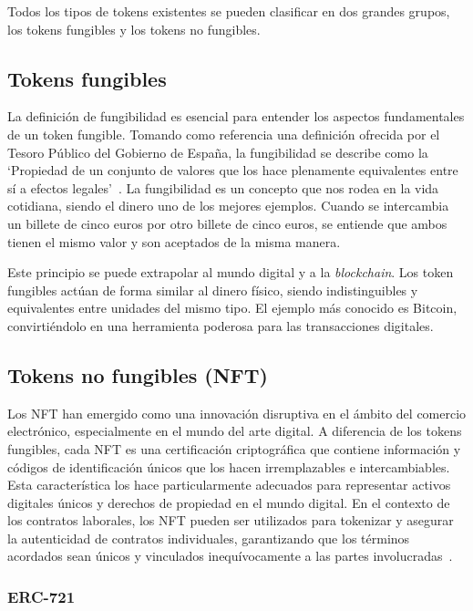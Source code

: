 Todos los tipos de tokens existentes se pueden clasificar en dos grandes grupos, los tokens fungibles y los tokens no fungibles.


\subsection{Tokens fungibles}

La definición de fungibilidad es esencial para entender los aspectos fundamentales de un token fungible. Tomando como referencia una definición ofrecida por el Tesoro Público del Gobierno de España, la fungibilidad se describe como la `Propiedad de un conjunto de valores que los hace plenamente equivalentes entre sí a efectos legales'~\cite{fungibilidadGob}.
La fungibilidad es un concepto que nos rodea en la vida cotidiana, siendo el dinero uno de los mejores ejemplos. Cuando se intercambia un billete de cinco euros por otro billete de cinco euros, se entiende que ambos tienen el mismo valor y son aceptados de la misma manera.

Este principio se puede extrapolar al mundo digital y a la \textit{blockchain}. Los token fungibles actúan de forma similar al dinero físico, siendo indistinguibles y equivalentes entre unidades del mismo tipo.
El ejemplo más conocido es Bitcoin, convirtiéndolo en una herramienta poderosa para las transacciones digitales.


\subsection{Tokens no fungibles (NFT)}

Los NFT han emergido como una innovación disruptiva en el ámbito del comercio electrónico, especialmente en el mundo del arte digital.
A diferencia de los tokens fungibles, cada NFT es una certificación criptográfica que contiene información y códigos de identificación únicos que los hacen irremplazables e intercambiables.
Esta característica los hace particularmente adecuados para representar activos digitales únicos y derechos de propiedad en el mundo digital.
En el contexto de los contratos laborales, los NFT pueden ser utilizados para tokenizar y asegurar la autenticidad de contratos individuales, garantizando que los términos acordados sean únicos y vinculados inequívocamente a las partes involucradas~\cite{NFTintroducción}.


\subsubsection{ERC-721}

